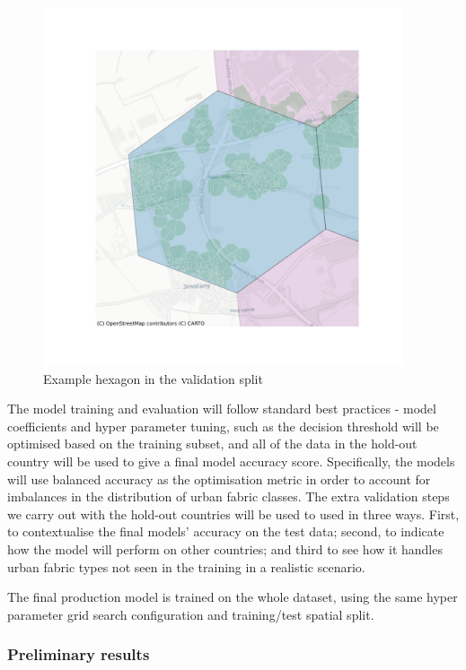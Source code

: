 \documentclass[
  letterpaper,
  DIV=11,
  numbers=noendperiod]{scrartcl}
\begin{document}
\begin{figure}[H]

{\centering \includegraphics[width=\linewidth,height=4.16667in,keepaspectratio]{../figures/algo_design/train_test_prague_zoom2.png}

}

\caption{Example hexagon in the validation split}

\end{figure}%

The model training and evaluation will follow standard best practices -
model coefficients and hyper parameter tuning, such as the decision
threshold will be optimised based on the training subset, and all of the
data in the hold-out country will be used to give a final model accuracy
score. Specifically, the models will use balanced accuracy as the
optimisation metric in order to account for imbalances in the
distribution of urban fabric classes. The extra validation steps we
carry out with the hold-out countries will be used to used in three
ways. First, to contextualise the final models' accuracy on the test
data; second, to indicate how the model will perform on other countries;
and third to see how it handles urban fabric types not seen in the
training in a realistic scenario.

The final production model is trained on the whole dataset, using the
same hyper parameter grid search configuration and training/test spatial
split.

\subsubsection{Preliminary results}\label{preliminary-results}
\end{document}
